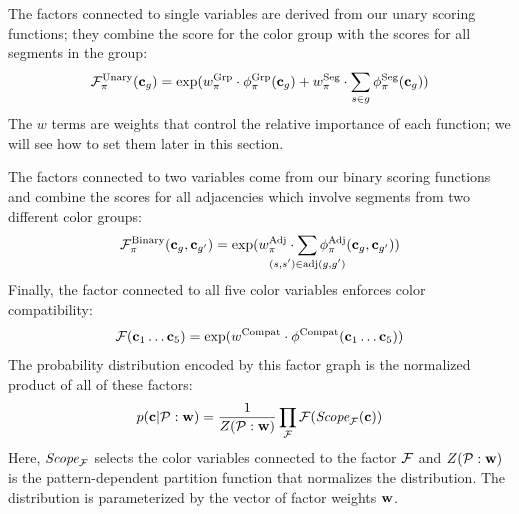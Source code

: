 The factors connected to single variables are derived from our unary scoring functions; they combine the score for the color group with the scores for all segments in the group:
\begin{equation*}
 \mathcal{F}^{\textrm{Unary}}_\pi(\mathbf{c}_g) =
 		\exp( w^{\textrm{Grp}}_\pi \cdot \phi^{\textrm{Grp}}_\pi(\mathbf{c}_g)  \\
 		     + w^{\textrm{Seg}}_\pi \cdot \sum_{s \in g} \phi^{\textrm{Seg}}_\pi(\mathbf{c}_g)) 
\end{equation*}
The $w$ terms are weights that control the relative importance of each function; we will see how to set them later in this section.

The factors connected to two variables come from our binary scoring functions and combine the scores for all adjacencies which involve segments from two different color groups:
\begin{equation*}
\factor^{\textrm{Binary}}_\prop(\colors_\group, \colors_\groupprime) =
	\exp( \adjTermWeight \cdot \sum_{\mathclap{(\segment, \segprime) \in \adj(\group, \groupprime)}} \adjInstStats( \colors_\group, \colors_\groupprime))
\end{equation*}
Finally, the factor connected to all five color variables enforces color compatibility:
\begin{equation*}
\mathcal{F}(\mathbf{c}_1 \ldots \mathbf{c}_5) = \exp(w^{\textrm{Compat}} \cdot \phi^{\textrm{Compat}}(\mathbf{c}_1 \ldots \mathbf{c}_5))
\end{equation*}
The probability distribution encoded by this factor graph is the normalized product of all of these factors:
\begin{equation*}
p(\mathbf{c} | \mathcal{P} : \mathbf{w}) = \frac{1}{Z(\mathcal{P} : \mathbf{w})} \prod_{\mathcal{F}} \mathcal{F}(\textit{Scope}_{\mathcal{F}}(\mathbf{c}))
\end{equation*}
Here, $\textit{Scope}_{\mathcal{F}}$ selects the color variables connected to the factor $\mathcal{F}$ and $Z(\mathcal{P} : \mathbf{w})$ is the pattern-dependent partition function that normalizes the distribution. The distribution is parameterized by the vector of factor weights $\mathbf{w}$.

